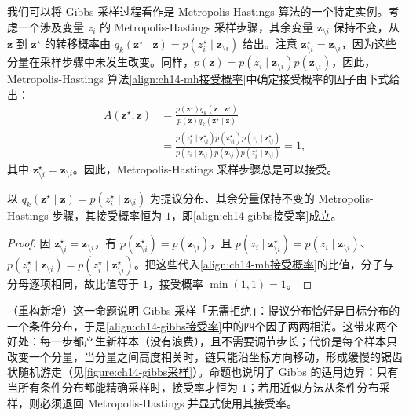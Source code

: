 \documentclass[../../main.tex]{subfiles}
\begin{document}
我们可以将 Gibbs 采样过程看作是 Metropolis-Hastings 算法的一个特定实例。考虑一个涉及变量 $z_{i}$ 的 Metropolis-Hastings 采样步骤，其余变量 $\bm{z}_{\setminus i}$ 保持不变，从 $\bm{z}$ 到 $\bm{z}^{\star}$ 的转移概率由 $q_{k}\!\left(\bm{z}^{\star}\mid\bm{z}\right)=p\!\left(z_{i}^{\star}\mid\bm{z}_{\setminus i}\right)$ 给出。注意 $\bm{z}_{\setminus i}^{\star}=\bm{z}_{\setminus i}$，因为这些分量在采样步骤中未发生改变。同样，$p(\bm{z})=p\!\left(z_{i}\mid\bm{z}_{\setminus i}\right)p\!\left(\bm{z}_{\setminus i}\right)$，因此，Metropolis-Hastings 算法\eqref{align:ch14-mh接受概率}中确定接受概率的因子由下式给出：
\begin{align}
A\!\left(\bm{z}^{\star},\bm{z}\right)&=\frac{p\!\left(\bm{z}^{\star}\right)q_{k}\!\left(\bm{z}\mid\bm{z}^{\star}\right)}{p(\bm{z})q_{k}\!\left(\bm{z}^{\star}\mid\bm{z}\right)}\nonumber\\
&=\frac{p\!\left(z_{i}^{\star}\mid\bm{z}_{\setminus i}^{\star}\right)p\!\left(\bm{z}_{\setminus i}^{\star}\right)p\!\left(z_{i}\mid\bm{z}_{\setminus i}^{\star}\right)}{p\!\left(z_{i}\mid\bm{z}_{\setminus i}\right)p\!\left(\bm{z}_{\setminus i}\right)p\!\left(z_{i}^{\star}\mid\bm{z}_{\setminus i}\right)}=1,
\label{align:ch14-gibbs接受率}
\end{align}
其中 $\bm{z}_{\setminus i}^{\star}=\bm{z}_{\setminus i}$。因此，Metropolis-Hastings 采样步骤总是可以接受。

\begin{proposition}\label{proposition:ch14-gibbs是mh特例}
以 $q_{k}\!\left(\bm{z}^{\star}\mid\bm{z}\right)=p\!\left(z_{i}^{\star}\mid\bm{z}_{\setminus i}\right)$ 为提议分布、其余分量保持不变的 Metropolis-Hastings 步骤，其接受概率恒为 $1$，即\eqref{align:ch14-gibbs接受率}成立。
\end{proposition}

\begin{proof}
因 $\bm{z}_{\setminus i}^{\star}=\bm{z}_{\setminus i}$，有 $p\!\left(\bm{z}_{\setminus i}^{\star}\right)=p\!\left(\bm{z}_{\setminus i}\right)$，且 $p\!\left(z_{i}\mid\bm{z}_{\setminus i}^{\star}\right)=p\!\left(z_{i}\mid\bm{z}_{\setminus i}\right)$、$p\!\left(z_{i}^{\star}\mid\bm{z}_{\setminus i}\right)=p\!\left(z_{i}^{\star}\mid\bm{z}_{\setminus i}^{\star}\right)$。把这些代入\eqref{align:ch14-mh接受概率}的比值，分子与分母逐项相同，故比值等于 $1$，接受概率 $\min\left(1,1\right)=1$。
\end{proof}

\begin{remark}（重构新增）这一命题说明 Gibbs 采样「无需拒绝」：提议分布恰好是目标分布的一个条件分布，于是\eqref{align:ch14-gibbs接受率}中的四个因子两两相消。这带来两个好处：每一步都产生新样本（没有浪费），且不需要调节步长；代价是每个样本只改变一个分量，当分量之间高度相关时，链只能沿坐标方向移动，形成缓慢的锯齿状随机游走（见\cref{figure:ch14-gibbs采样}）。命题也说明了 Gibbs 的适用边界：只有当所有条件分布都能精确采样时，接受率才恒为 $1$；若用近似方法从条件分布采样，则必须退回 Metropolis-Hastings 并显式使用其接受率。
\end{remark}
\end{document}
